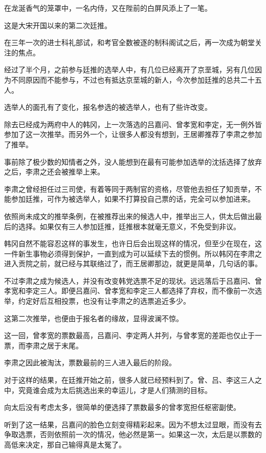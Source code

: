 在龙涎香气的笼罩中，一名内侍，又在陛前的白屏风添上了一笔。

这是大宋开国以来的第二次廷推。

在三年一次的进士科礼部试，和考官全数被逐的制科阁试之后，再一次成为朝堂关注的焦点。

经过了半个月，之前参与廷推的选举人中，有几位已经离开了京垩城，另有几位因为不同原因而不能参与，不过也有抵达京垩城的新人，今次参加廷推的总共二十五人。

选举人的面孔有了变化，报名参选的被选举人，也有了些许改变。

除去已经成为两府中人的韩冈，上一次落选的吕嘉问、曾孝宽和李定，无一例外皆参加了这一次推举。而另外一个，让很多人都没有想到，王居卿推荐了李肃之参加了推举。

事前除了极少数的知情者之外，没人能想到在最有可能参加选举的沈括选择了放弃之后，李肃之还会被推举上来。

李肃之曾经担任过三司使，有着等同于两制官的资格，尽管他去担任了知贡举，不能参加廷推，可作为被选举人，如果不打算投自己票的话，完全可以参加进来。

依照尚未成文的推举条例，在被推荐出来的候选人中，推举出三人，供太后做出最后的选择。如果仅有三人参加廷推，廷推根本就毫无意义，不免受到非议。

韩冈自然不能容忍这样的事发生，也许日后会出现这样的情况，但至少在现在，这一件新生事物必须得到保护，一直到成为可以延续下去的惯例。所以韩冈在李肃之进入贡院之前，就已经与其联络过了，而王居卿那边，就更是简单，几句话的事。

不过李肃之成为候选人，并没有改变韩党选票不足的现状。远远落后于吕嘉问、曾孝宽和李定三人。即便吕嘉问、曾孝宽和李定三人都选择了弃权，而不像前一次选举，约定好后互相投票，也没有让李肃之的选票追近多少。

这第二次推举，也便由于报名者的缘故，显得波澜不惊。

这一回，曾孝宽的票数最高，吕嘉问、李定两人并列，与曾孝宽的差距也仅止于一票，而李肃之居于末尾。

李肃之因此被淘汰，票数最前的三人进入最后的阶段。

对于这样的结果，在廷推开始之前，很多人就已经预料到了。曾、吕、李这三人之中，究竟谁会成为太后挑选出来的幸运儿，才是人们猜测的目标。

向太后没有考虑太多，很简单的便选择了票数最多的曾孝宽担任枢密副使。

听到了这一结果，吕嘉问的脸色立刻变得精彩起来。因为不想太过显眼，而没有去争取选票，否则依照前一次的情况，他必然是第一。如果这一次，太后是以票数的高低来决定，那自己输得真是太冤了。

